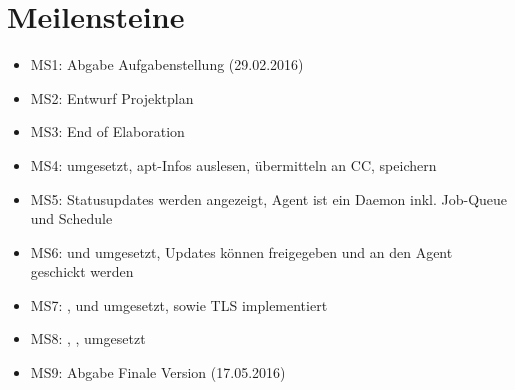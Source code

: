 \section*{Meilensteine}

\begin{itemize}
    \item MS1: Abgabe Aufgabenstellung (29.02.2016)
    \item MS2: Entwurf Projektplan
    \item MS3: End of Elaboration
    \item MS4:  umgesetzt, apt-Infos auslesen, übermitteln an CC, speichern
    \item MS5: Statusupdates werden angezeigt, Agent ist ein Daemon inkl. Job-Queue und Schedule
    \item MS6:  und  umgesetzt, Updates können freigegeben und an den Agent geschickt werden
    \item MS7: ,  und  umgesetzt, sowie TLS implementiert
    \item MS8: , ,  umgesetzt
    \item MS9: Abgabe Finale Version (17.05.2016)
\end{itemize}